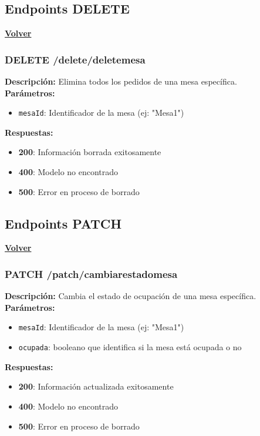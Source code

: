 \documentclass[12pt]{article}
\begin{document}
\clearpage

\subsection{Endpoints DELETE}
\hyperlink{anchor-indice}{\textbf{Volver}}\\

\subsubsection{DELETE /delete/deletemesa}
\textbf{Descripción:} Elimina todos los pedidos de una mesa específica.\\

\textbf{Parámetros:}
\begin{itemize}
    \item \texttt{mesaId}: Identificador de la mesa (ej: "Mesa1")
\end{itemize}

\textbf{Respuestas:}
\begin{itemize}
    \item \textbf{200}: Información borrada exitosamente
    \item \textbf{400}: Modelo no encontrado
    \item \textbf{500}: Error en proceso de borrado
\end{itemize}

\clearpage

\subsection{Endpoints PATCH}
\hyperlink{anchor-indice}{\textbf{Volver}}\\

\subsubsection{PATCH /patch/cambiarestadomesa}
\textbf{Descripción:} Cambia el estado de ocupación de una mesa específica.\\

\textbf{Parámetros:}
\begin{itemize}
    \item \texttt{mesaId}: Identificador de la mesa (ej: "Mesa1")
    \item \texttt{ocupada}: booleano que identifica si la mesa está ocupada o no
\end{itemize}

\textbf{Respuestas:}
\begin{itemize}
    \item \textbf{200}: Información actualizada exitosamente
    \item \textbf{400}: Modelo no encontrado
    \item \textbf{500}: Error en proceso de borrado
\end{itemize}
\end{document}
